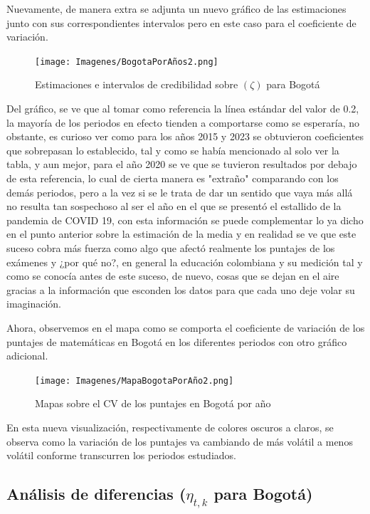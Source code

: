 \documentclass[12pt]{article}
\begin{document}
Nuevamente, de manera extra se adjunta un nuevo gráfico de las estimaciones junto con sus correspondientes intervalos pero en este caso para el coeficiente de variación. 

\begin{figure}[H]
    \centering
    \texttt{[image: Imagenes/BogotaPorAños2.png]}
    \caption{Estimaciones e intervalos de credibilidad sobre $(\zeta)$ para Bogotá}
    \label{fig_enter_label}
\end{figure}

Del gráfico, se ve que al tomar como referencia la línea estándar del valor de 0.2, la mayoría de los periodos en efecto tienden a comportarse como se esperaría, no obstante, es curioso ver como para los años 2015 y 2023 se obtuvieron coeficientes que sobrepasan lo establecido, tal y como se había mencionado al solo ver la tabla, y aun mejor, para el año 2020 se ve que se tuvieron resultados por debajo de esta referencia, lo cual de cierta manera es "extraño" comparando con los demás periodos, pero a la vez si se le trata de dar un sentido que vaya más allá no resulta tan sospechoso al ser el año en el que se presentó el estallido de la pandemia de COVID 19, con esta información se puede complementar lo ya dicho en el punto anterior sobre la estimación de la media y en realidad se ve que este suceso cobra más fuerza como algo que afectó realmente los puntajes de los exámenes y ¿por qué no?, en general la educación colombiana y su medición tal y como se conocía antes de este suceso, de nuevo, cosas que se dejan en el aire gracias a la información que esconden los datos para que cada uno deje volar su imaginación.

Ahora, observemos en el mapa como se comporta el coeficiente de variación de los puntajes de matemáticas en Bogotá en los diferentes periodos con otro gráfico adicional.

\newpage

\begin{figure}[H]
    \centering
    \texttt{[image: Imagenes/MapaBogotaPorAño2.png]}
    \caption{Mapas sobre el CV de los puntajes en Bogotá por año}
    \label{fig_enter_label}
\end{figure}

En esta nueva visualización, respectivamente de colores oscuros a claros, se observa como la variación de los puntajes va cambiando de más volátil a menos volátil conforme transcurren los periodos estudiados.

\subsection{Análisis de diferencias ($\eta_{t,k}$ para Bogotá)}
\end{document}
